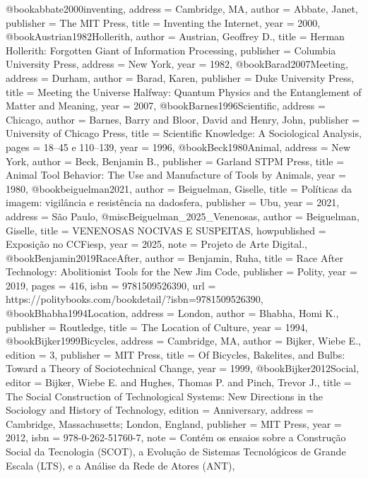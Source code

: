 @book{abbate2000inventing,
  address   = {Cambridge, MA},
  author    = {Abbate, Janet},
  publisher = {The MIT Press},
  title     = {{Inventing the Internet}},
  year      = {2000},
}
@book{Austrian1982Hollerith,
  author    = {Austrian, Geoffrey D.},
  title     = {{Herman Hollerith: Forgotten Giant of Information Processing}},
  publisher = {Columbia University Press},
  address   = {New York},
  year      = {1982},
}
@book{Barad2007Meeting,
  address   = {Durham},
  author    = {Barad, Karen},
  publisher = {Duke University Press},
  title     = {{Meeting the Universe Halfway: Quantum Physics and the Entanglement of Matter and Meaning}},
  year      = {2007},
}
@book{Barnes1996Scientific,
  address   = {Chicago},
  author    = {Barnes, Barry and Bloor, David and Henry, John},
  publisher = {University of Chicago Press},
  title     = {{Scientific Knowledge: A Sociological Analysis}},
  pages     = {18--45 e 110--139},
  year      = {1996},
}
@book{Beck1980Animal,
  address   = {New York},
  author    = {Beck, Benjamin B.},
  publisher = {Garland STPM Press},
  title     = {{Animal Tool Behavior: The Use and Manufacture of Tools by Animals}},
  year      = {1980},
}
@book{beiguelman2021,
  author    = {Beiguelman, Giselle},
  title     = {Políticas da imagem: vigilância e resistência na dadosfera},
  publisher = {Ubu},
  year      = {2021},
  address   = {São Paulo},
}
@misc{Beiguelman_2025_Venenosas,
  author = {Beiguelman, Giselle},
  title = {VENENOSAS NOCIVAS E SUSPEITAS},
  howpublished = {Exposição no CCFiesp},
  year = {2025},
  note = {Projeto de Arte Digital.},
}
@book{Benjamin2019RaceAfter,
  author    = {Benjamin, Ruha},
  title     = {{Race After Technology: Abolitionist Tools for the New Jim Code}},
  publisher = {Polity},
  year      = {2019},
  pages     = {416},
  isbn      = {9781509526390},
  url       = {https://politybooks.com/bookdetail/?isbn=9781509526390},
}
@book{Bhabha1994Location,
  address   = {London},
  author    = {Bhabha, Homi K.},
  publisher = {Routledge},
  title     = {{The Location of Culture}},
  year      = {1994},
}
@book{Bijker1999Bicycles,
  address   = {Cambridge, MA},
  author    = {Bijker, Wiebe E.},
  edition   = {3},
  publisher = {MIT Press},
  title     = {{Of Bicycles, Bakelites, and Bulbs: Toward a Theory of Sociotechnical Change}},
  year      = {1999},
}
@book{Bijker2012Social,
  editor    = {Bijker, Wiebe E. and Hughes, Thomas P. and Pinch, Trevor J.},
  title     = {{The Social Construction of Technological Systems: New Directions in the Sociology and History of Technology}},
  edition   = {Anniversary},
  address   = {Cambridge, Massachusetts; London, England},
  publisher = {MIT Press},
  year      = {2012},
  isbn      = {978-0-262-51760-7},
  note      = {Contém os ensaios sobre a Construção Social da Tecnologia (SCOT), a Evolução de Sistemas Tecnológicos de Grande Escala (LTS), e a Análise da Rede de Atores (ANT)},
}
